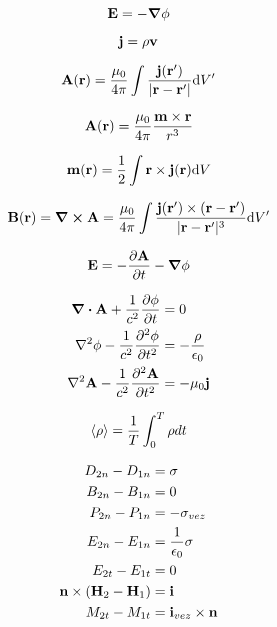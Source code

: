 \documentclass[11pt,twoside]{article}
\begin{document}
\begin{multicols}{3}
\begin{footnotesize}
\begin{equation}
\vb{E} = - \gradient \phi
\end{equation}

\begin{equation}
\vb{j} = \rho \vb{v}
\end{equation}

\begin{equation}
\vb{A}(\vb{r}) = \frac{\mu_0}{4\pi} \int \frac{\vb{j}(\vb{r'})}{|\vb{r}-\vb{r'}|}\dd V'
\end{equation}

\begin{equation}
\vb{A}(\vb{r}) = \frac{\mu_0}{4\pi} \frac{\vb{m}\times\vb{r}}{r^3}
\end{equation}

\begin{equation}
\vb{m}(\vb{r}) = \frac{1}{2} \int \vb{r} \times \vb{j}(\vb{r})\dd V
\end{equation}

\begin{equation}
\vb{B}(\vb{r}) = \curl \vb{A} = \frac{\mu_0}{4\pi} \int \frac{\vb{j}(\vb{r'})\times (\vb{r}-\vb{r'})}{|\vb{r}-\vb{r'}|^3} \dd V'
\end{equation}

\begin{equation}
\vb{E} = -\pdv{\vb{A}}{t} - \gradient \phi
\end{equation}

\begin{equation}
\begin{split}
\div{\vb{A}} + \frac{1}{c^2} \pdv{\phi}{t} &= 0 \\
\laplacian{\phi} - \frac{1}{c^2} \pdv[2]{\phi}{t} &= -\frac{\rho}{\epsilon_0} \\
\laplacian{\vb{A}} - \frac{1}{c^2} \pdv[2]{\vb{A}}{t} &= -\mu_0 \vb{j}
\end{split}
\end{equation}

\begin{equation}
\expval{\rho} = \frac{1}{T} \int_0^T \rho dt 
\end{equation}

\begin{equation}
\begin{split}
D_{2n} - D_{1n} &= \sigma \\
B_{2n} - B_{1n} &= 0 \\
P_{2n} - P_{1n} &= -\sigma_{vez} \\
E_{2n} - E_{1n} &= \frac{1}{\epsilon_0} \sigma \\
E_{2t} - E_{1t} &= 0 \\
\vb{n}\times (\vb{H}_2 - \vb{H}_1) &= \vb{i} \\
M_{2t} - M_{1t} &= \vb{i}_{vez} \times \vb{n}
\end{split}
\end{equation}


\end{footnotesize}
\end{multicols}
\end{document}
